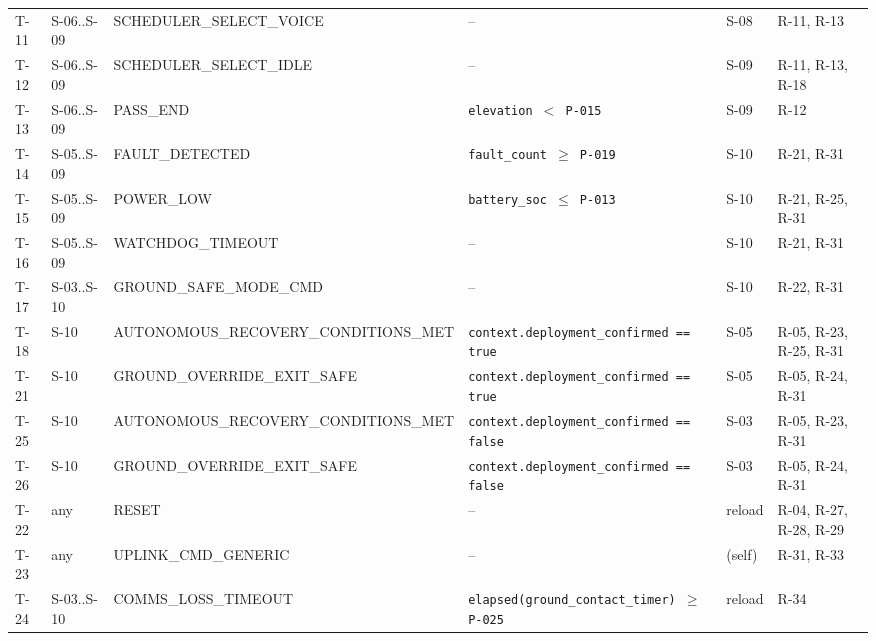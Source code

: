{\begin{longtable}{@{}p{}p{}p{}p{}p{}p{}@{}}
T-11 & S-06..S-09 & SCHEDULER\_\allowbreak SELECT\_\allowbreak VOICE & -- & S-08 & \mbox{R-11}, \mbox{R-13} \\
T-12 & S-06..S-09 & SCHEDULER\_\allowbreak SELECT\_\allowbreak IDLE & -- & S-09 & \mbox{R-11}, \mbox{R-13}, \mbox{R-18} \\
T-13 & S-06..S-09 & PASS\_\allowbreak END & \texttt{elevation $<$ P-015} & S-09 & \mbox{R-12} \\
T-14 & S-05..S-09 & FAULT\_\allowbreak DETECTED & \texttt{fault\_\allowbreak count $\geq$ P-019} & S-10 & \mbox{R-21}, \mbox{R-31} \\
T-15 & S-05..S-09 & POWER\_\allowbreak LOW & \texttt{battery\_\allowbreak soc $\leq$ P-013} & S-10 & \mbox{R-21}, \mbox{R-25}, \mbox{R-31} \\
T-16 & S-05..S-09 & WATCHDOG\_\allowbreak TIMEOUT & -- & S-10 & \mbox{R-21}, \mbox{R-31} \\
T-17 & S-03..S-10 & GROUND\_\allowbreak SAFE\_\allowbreak MODE\_\allowbreak CMD & -- & S-10 & \mbox{R-22}, \mbox{R-31} \\
T-18 & S-10 & AUTONOMOUS\_\allowbreak RECOVERY\_\allowbreak CONDITIONS\_\allowbreak MET & \texttt{context.deployment\_\allowbreak confirmed == true} & S-05 & \mbox{R-05}, \mbox{R-23}, \mbox{R-25}, \mbox{R-31} \\
T-21 & S-10 & GROUND\_\allowbreak OVERRIDE\_\allowbreak EXIT\_\allowbreak SAFE & \texttt{context.deployment\_\allowbreak confirmed == true} & S-05 & \mbox{R-05}, \mbox{R-24}, \mbox{R-31} \\
T-25 & S-10 & AUTONOMOUS\_\allowbreak RECOVERY\_\allowbreak CONDITIONS\_\allowbreak MET & \texttt{context.deployment\_\allowbreak confirmed == false} & S-03 & \mbox{R-05}, \mbox{R-23}, \mbox{R-31} \\
T-26 & S-10 & GROUND\_\allowbreak OVERRIDE\_\allowbreak EXIT\_\allowbreak SAFE & \texttt{context.deployment\_\allowbreak confirmed == false} & S-03 & \mbox{R-05}, \mbox{R-24}, \mbox{R-31} \\
T-22 & any & RESET & -- & reload & \mbox{R-04}, \mbox{R-27}, \mbox{R-28}, \mbox{R-29} \\
T-23 & any & UPLINK\_\allowbreak CMD\_\allowbreak GENERIC & -- & (self) & \mbox{R-31}, \mbox{R-33} \\
T-24 & S-03..S-10 & COMMS\_\allowbreak LOSS\_\allowbreak TIMEOUT & \texttt{elapsed(ground\_\allowbreak contact\_\allowbreak timer) $\geq$ P-025} & reload & \mbox{R-34} \\
\bottomrule
\end{longtable}}

